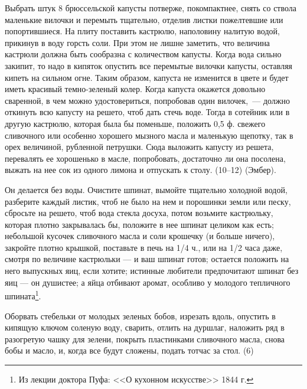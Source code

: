 Выбрать штук 8 брюссельской капусты потверже, покомпактнее, снять со ствола маленькие вилочки и перемыть тщательно, отделив листки пожелтевшие или попортившиеся. На плиту поставить кастрюлю, наполовину налитую водой, прикинув в воду горсть соли. При этом не лишне заметить, что величина кастрюли должна быть сообразна с количеством капусты. Когда вода сильно закипит, то надо в кипяток опустить все перемытые вилочки капусты, оставляя кипеть на сильном огне. Таким образом, капуста не изменится в цвете и будет иметь красивый темно-зеленый колер. Когда капуста окажется довольно сваренной, в чем можно удостовериться, попробовав один вилочек,~--- должно откинуть всю капусту на решето, чтоб дать стечь воде. Тогда в сотейник или в другую кастрюлю, которая была бы поменьше, положить 0,5 ф. свежего сливочного или особенно хорошего мызного масла и маленькую щепотку, так в орех величиной, рубленной петрушки. Сюда выложить капусту из решета, перевалять ее хорошенько в масле, попробовать, достаточно ли она посолена, выжать на нее сок из одного лимона и отпускать к столу. (10--12) (Эмбер). 


Он делается без воды. Очистите шпинат, вымойте тщательно холодной водой, разберите каждый листик, чтоб не было на нем и порошинки земли или песку, сбросьте на решето, чтоб вода стекла досуха, потом возьмите кастрюльку, которая плотно закрывалась бы, положите в нее шпинат целиком как есть; небольшой кусочек сливочного масла и соли крошечку (и больше ничего), закройте плотно крышкой, поставьте в печь на 1/4 ч., или на 1/2 часа даже, смотря по величине кастрюльки — и ваш шпинат готов; остается положить на него выпускных яиц, если хотите; истинные любители предпочитают шпинат без яиц — он душистее; а яйца отбивают аромат, особливо у молодого тепличного шпината\footnote{Из лекции доктора Пуфа: <<О кухонном искусстве>> 1844 г.}.


Оборвать стебельки от молодых зеленых бобов, изрезать вдоль, опустить в кипящую ключом соленую воду, сварить, отлить на дуршлаг, наложить ряд в разогретую чашку для зелени, покрыть пластинками сливочного масла, снова бобы и масло, и, когда все будут сложены, подать тотчас за стол. (6) 


